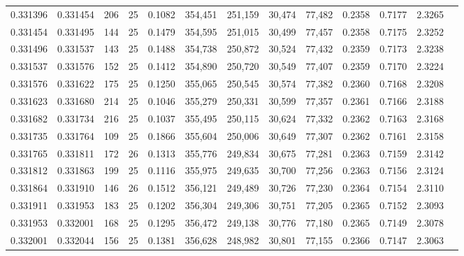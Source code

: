 \begin{tabular}{rrrrrrrrrrrrr}
0.331396 & 0.331454 &   206 &  25 &                                     0.1082 & 354,451 & 251,159 &  30,474 &  77,482 & 0.2358 & 0.7177 & 2.3265 \\
0.331454 & 0.331495 &   144 &  25 &                                     0.1479 & 354,595 & 251,015 &  30,499 &  77,457 & 0.2358 & 0.7175 & 2.3252 \\
0.331496 & 0.331537 &   143 &  25 &                                     0.1488 & 354,738 & 250,872 &  30,524 &  77,432 & 0.2359 & 0.7173 & 2.3238 \\
0.331537 & 0.331576 &   152 &  25 &                                     0.1412 & 354,890 & 250,720 &  30,549 &  77,407 & 0.2359 & 0.7170 & 2.3224 \\
0.331576 & 0.331622 &   175 &  25 &                                     0.1250 & 355,065 & 250,545 &  30,574 &  77,382 & 0.2360 & 0.7168 & 2.3208 \\
0.331623 & 0.331680 &   214 &  25 &                                     0.1046 & 355,279 & 250,331 &  30,599 &  77,357 & 0.2361 & 0.7166 & 2.3188 \\
0.331682 & 0.331734 &   216 &  25 &                                     0.1037 & 355,495 & 250,115 &  30,624 &  77,332 & 0.2362 & 0.7163 & 2.3168 \\
0.331735 & 0.331764 &   109 &  25 &                                     0.1866 & 355,604 & 250,006 &  30,649 &  77,307 & 0.2362 & 0.7161 & 2.3158 \\
0.331765 & 0.331811 &   172 &  26 &                                     0.1313 & 355,776 & 249,834 &  30,675 &  77,281 & 0.2363 & 0.7159 & 2.3142 \\
0.331812 & 0.331863 &   199 &  25 &                                     0.1116 & 355,975 & 249,635 &  30,700 &  77,256 & 0.2363 & 0.7156 & 2.3124 \\
0.331864 & 0.331910 &   146 &  26 &                                     0.1512 & 356,121 & 249,489 &  30,726 &  77,230 & 0.2364 & 0.7154 & 2.3110 \\
0.331911 & 0.331953 &   183 &  25 &                                     0.1202 & 356,304 & 249,306 &  30,751 &  77,205 & 0.2365 & 0.7152 & 2.3093 \\
0.331953 & 0.332001 &   168 &  25 &                                     0.1295 & 356,472 & 249,138 &  30,776 &  77,180 & 0.2365 & 0.7149 & 2.3078 \\
0.332001 & 0.332044 &   156 &  25 &                                     0.1381 & 356,628 & 248,982 &  30,801 &  77,155 & 0.2366 & 0.7147 & 2.3063 \\

\end{tabular}
